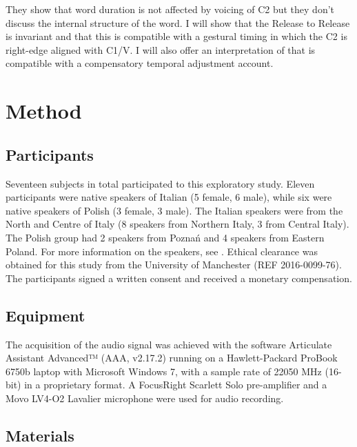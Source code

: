 \documentclass[]{JASAnew}
\begin{document}
They show that word duration is not affected by voicing of C2 but they
don't discuss the internal structure of the word. I will show that the
Release to Release is invariant and that this is compatible with a
gestural timing in which the C2 is right-edge aligned with C1/V. I will
also offer an interpretation of \citet{maddieson1976} that is compatible
with a compensatory temporal adjustment account.

\hypertarget{method}{%
\section{Method}\label{method}}

\hypertarget{participants}{%
\subsection{Participants}\label{participants}}

Seventeen subjects in total participated to this exploratory study.
Eleven participants were native speakers of Italian (5 female, 6 male),
while six were native speakers of Polish (3 female, 3 male). The Italian
speakers were from the North and Centre of Italy (8 speakers from
Northern Italy, 3 from Central Italy). The Polish group had 2 speakers
from Poznań and 4 speakers from Eastern Poland. For more information on
the speakers, see . Ethical clearance was obtained for
this study from the University of Manchester (REF 2016-0099-76). The
participants signed a written consent and received a monetary
compensation.

\hypertarget{equipment}{%
\subsection{Equipment}\label{equipment}}

The acquisition of the audio signal was achieved with the software
Articulate Assistant Advanced™ (AAA, v2.17.2) running on a
Hawlett-Packard ProBook 6750b laptop with Microsoft Windows 7, with a
sample rate of 22050 MHz (16-bit) in a proprietary format. A FocusRight
Scarlett Solo pre-amplifier and a Movo LV4-O2 Lavalier microphone were
used for audio recording.

\hypertarget{materials}{%
\subsection{Materials}\label{materials}}
\end{document}
